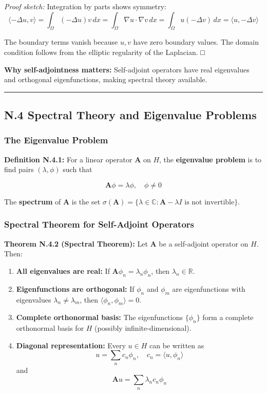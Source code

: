 \documentclass[
]{article}
\begin{document}
\emph{Proof sketch:} Integration by parts shows symmetry:
\[\langle -\Delta u, v \rangle = \int_\Omega (-\Delta u) v\,dx = \int_\Omega \nabla u \cdot \nabla v\,dx = \int_\Omega u (-\Delta v)\,dx = \langle u, -\Delta v \rangle\]

The boundary terms vanish because \(u, v\) have zero boundary values.
The domain condition follows from the elliptic regularity of the
Laplacian. □

\textbf{Why self-adjointness matters:} Self-adjoint operators have real
eigenvalues and orthogonal eigenfunctions, making spectral theory
available.

\begin{center}\rule{0.5\linewidth}{0.5pt}\end{center}

\subsection{N.4 Spectral Theory and Eigenvalue
Problems}\label{n.4-spectral-theory-and-eigenvalue-problems}

\subsubsection{The Eigenvalue Problem}\label{the-eigenvalue-problem}

\textbf{Definition N.4.1:} For a linear operator \(\mathbf{A}\) on
\(H\), the \textbf{eigenvalue problem} is to find pairs
\((\lambda, \phi)\) such that

\[\mathbf{A}\phi = \lambda\phi, \quad \phi \neq 0\]

The \textbf{spectrum} of \(\mathbf{A}\) is the set
\(\sigma(\mathbf{A}) = \{\lambda \in \mathbb{C} : \mathbf{A} - \lambda I \text{ is not invertible}\}\).

\subsubsection{Spectral Theorem for Self-Adjoint
Operators}\label{spectral-theorem-for-self-adjoint-operators}

\textbf{Theorem N.4.2 (Spectral Theorem):} Let \(\mathbf{A}\) be a
self-adjoint operator on \(H\). Then:

\begin{enumerate}
\def\labelenumi{\arabic{enumi}.}
\item
  \textbf{All eigenvalues are real:} If
  \(\mathbf{A}\phi_n = \lambda_n\phi_n\), then
  \(\lambda_n \in \mathbb{R}\).
\item
  \textbf{Eigenfunctions are orthogonal:} If \(\phi_n\) and \(\phi_m\)
  are eigenfunctions with eigenvalues \(\lambda_n \neq \lambda_m\), then
  \(\langle \phi_n, \phi_m \rangle = 0\).
\item
  \textbf{Complete orthonormal basis:} The eigenfunctions \(\{\phi_n\}\)
  form a complete orthonormal basis for \(H\) (possibly
  infinite-dimensional).
\item
  \textbf{Diagonal representation:} Every \(u \in H\) can be written as
  \[u = \sum_n c_n\phi_n, \quad c_n = \langle u, \phi_n \rangle\] and
  \[\mathbf{A}u = \sum_n \lambda_n c_n\phi_n\]
\end{enumerate}
\end{document}
